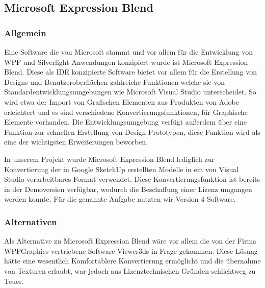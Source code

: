 \subsection{Microsoft Expression Blend}
\subsubsection{Allgemein}
Eine  Software die von Microsoft stammt und vor allem für die Entwicklung von WPF und Silverlight Anwendungen konzipiert wurde ist Microsoft Expression Blend. Diese als IDE konzipierte Software  bietet vor allem für die Erstellung von Designs und Benutzeroberflächen zahlreiche Funktionen welche sie von Standardentwicklungsumgebungen wie Microsoft Visual Studio unterscheidet. So wird etwa der Import von Grafischen Elementen aus Produkten von Adobe erleichtert und es sind verschiedene Konvertierungsfunktionen, für Graphische Elemente vorhanden. Die Entwicklungsumgebung verfügt außerdem über eine Funktion zur schnellen Erstellung von Design Prototypen, diese Funktion wird als eine der wichtigsten Erweiterungen beworben.

In unserem Projekt wurde Microsoft Expression Blend lediglich zur Konvertierung der in Google SketchUp erstellten Modelle in ein von Visual Studio verarbeitbares Format verwendet. Diese Konvertierungsfunktion ist bereits in der Demoversion verfügbar, wodurch die Beschaffung einer Lizenz umgangen werden konnte. Für die genannte Aufgabe nutzten wir Version 4 Software.

\subsubsection{Alternativen}
Als Alternative zu Microsoft Expression Blend wäre vor allem die von der Firma WPFGraphics vertriebene Software Viewer3ds in Frage gekommen. Diese Lösung hätte eine wesentlich Komfortablere Konvertierung ermöglicht und die übernahme von Texturen erlaubt, war jedoch aus Lizenztechnischen Gründen schlichtweg zu Teuer.